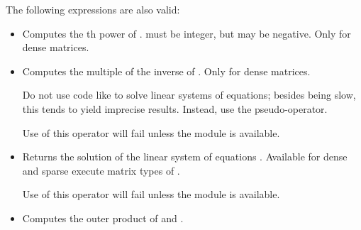 The following expressions are also valid:
\begin{itemize} 
\item {}

  Computes the th power of .  must be
  integer, but may be negative. Only for dense matrices.

\item {}

  Computes the  multiple of the inverse of
  . Only for dense matrices.

  Do not use code like  to solve linear systems of
  equations; besides being slow, this tends to yield imprecise
  results. Instead, use the  pseudo-operator.

  Use of this operator will fail unless the module
   is available.

\item {}

  Returns the solution of the linear system of equations .
  Available for dense and sparse execute matrix types of .

  Use of this operator will fail unless the module
   is available.

\item {}
  
  Computes the outer product of  and .
\end{itemize}
